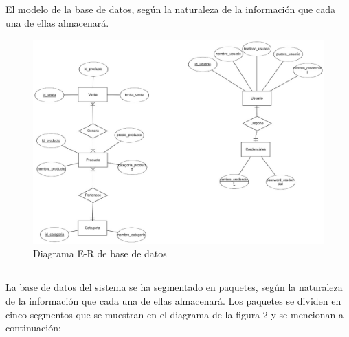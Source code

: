 \documentclass[10pt,a4paper]{article}
\begin{document}
\subsection{
	\textit{
		\color{colorESCOM}{Modelo E-R}
	}
}
El modelo de la base de datos, según la naturaleza de la información que cada una de ellas almacenará.

\begin{figure}[H]
	\includegraphics[scale=.45]{modeloER}
	\centering
	\caption{Diagrama E-R de base de datos}
	\label{img:modeloER}
\end{figure} 

\pagebreak

\subsection{
	\textit{
		\color{colorESCOM}{Modelo Relacional}
	}
}

La base de datos del sistema se ha segmentado en paquetes, según la naturaleza de la información
que cada una de ellas almacenará. Los paquetes se dividen en cinco segmentos que se muestran en el
diagrama de la figura 2 y se mencionan a continuación:
	
\end{document}
